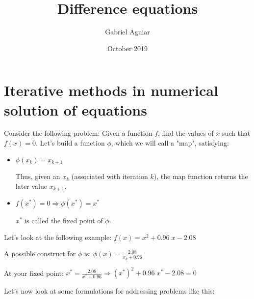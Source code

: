 \documentclass{article}
\title{Difference equations}
\author{Gabriel Aguiar}
\date{October 2019}
\begin{document}
\maketitle

\section{Iterative methods in numerical solution of equations}

Consider the following problem: Given a function $f$, find the values of $x$ such that $f(x) = 0$. Let's build a function $\phi$, which we will call a "map", satisfying:

\begin{itemize}
    
\item $\phi (x_{k}) = x_{k + 1}$

Thus, given an $x_{k}$ (associated with iteration $k$), the map function returns the later value $x_{k + 1}$.

\item $f(x^{*}) = 0 \Rightarrow \phi (x^{*}) = x^{*}$

$x^{*}$ is called the fixed point of $\phi$.

\end{itemize}

Let's look at the following example: $f(x) = x^{2} + 0.96 \; x - 2.08$

\hfill

A possible construct for $\phi$ is: $\phi (x) = \frac{2.08}{x_{k} + 0.96}$

\hfill

At your fixed point: $x^{*} = \frac{2.08}{x^{*} + 0.96} \Rightarrow (x^{*})^{2} + 0.96 \; x^{*} - 2.08 = 0$

\hfill

Let's now look at some formulations for addressing problems like this:
\end{document}
